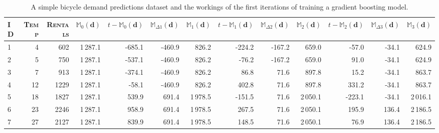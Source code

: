 \documentclass[xcolor={table}]{beamer}
\newcommand{\Toprule}[0]{\hline}
\newcommand{\Midrule}[0]{\hline}
\newcommand{\featN}[1]{\textsc{#1}}
\begin{document}
\begin{frame}
\begin{table}
\caption{A simple bicycle demand predictions dataset and the workings of the first iterations of training a gradient boosting model.}
\label{tab:grad_boost_demo_data}
\begin{tiny}
{\setlength{\tabcolsep}{0.1em}
\begin{tabular*}{27pc}{@{\extracolsep{\fill}}lrrrrrrrrrrrr@{}}
\Toprule
\featN{ID} &  \featN{Temp} &  \featN{Rentals} &  $\mathbb{M}_{0}(\mathbf{d})$ &  $t - \mathbb{M}_{0}(\mathbf{d})$ & $\mathbb{M}_{\Delta 1}(\mathbf{d})$  &  $\mathbb{M}_{1}(\mathbf{d})$ & $t - \mathbb{M}_{1}(\mathbf{d})$ & $\mathbb{M}_{\Delta 2}(\mathbf{d})$ &  $\mathbb{M}_{2}(\mathbf{d})$ &  $t - \mathbb{M}_{2}(\mathbf{d})$ &  $\mathbb{M}_{\Delta 3}(\mathbf{d})$ &  $\mathbb{M}_{3}(\mathbf{d})$ \\
\Midrule
1  &            4 &      602 &        1\,287.1 &      -685.1 &            -460.9 &       826.2 &    -224.2 &            -167.2 &       659.0 &     -57.0 &             -34.1 &       624.9 \\
2  &            5 &      750 &        1\,287.1 &      -537.1 &            -460.9 &       826.2 &     -76.2 &            -167.2 &       659.0 &      91.0 &             -34.1 &       624.9 \\
3  &            7 &      913 &        1\,287.1 &      -374.1 &            -460.9 &       826.2 &      86.8 &              71.6 &       897.8 &      15.2 &             -34.1 &       863.7 \\
4  &           12 &     1229 &        1\,287.1 &       -58.1 &            -460.9 &       826.2 &     402.8 &              71.6 &       897.8 &     331.2 &             -34.1 &       863.7 \\
5  &           18 &     1827 &        1\,287.1 &       539.9 &             691.4 &      1\,978.5 &    -151.5 &              71.6 &      2\,050.1 &    -223.1 &             -34.1 &      2\,016.1 \\
6  &           23 &     2246 &        1\,287.1 &       958.9 &             691.4 &      1\,978.5 &     267.5 &              71.6 &      2\,050.1 &     195.9 &             136.4 &      2\,186.5 \\
7  &           27 &     2127 &        1\,287.1 &       839.9 &             691.4 &      1\,978.5 &     148.5 &              71.6 &      2\,050.1 &      76.9 &             136.4 &      2\,186.5 \\

\end{tabular*}}
\end{tiny}
\end{table}
\end{frame}
\end{document}
